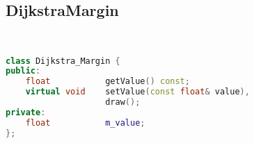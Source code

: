\subsection{DijkstraMargin}
\begin{lstlisting}[language=C++]


class Dijkstra_Margin {
public:
    float           getValue() const;
    virtual void    setValue(const float& value),
                    draw();
private:
    float           m_value;
};






\end{lstlisting}
